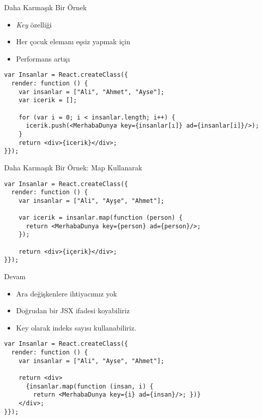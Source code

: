 \documentclass[presentation]{beamer}
\begin{document}
\begin{frame}[fragile,label=sec-4]{Daha Karmaşık Bir Örnek}
 \begin{itemize}
\item \emph{Key} özelliği
\item Her çocuk elemanı eşsiz yapmak için
\item Performans artışı
\end{itemize}

\begin{verbatim}
var Insanlar = React.createClass({
  render: function () {
    var insanlar = ["Ali", "Ahmet", "Ayse"];
    var icerik = [];

    for (var i = 0; i < insanlar.length; i++) {
      icerik.push(<MerhabaDunya key={insanlar[ı]} ad={insanlar[i]}/>);
    }
    return <div>{icerik}</div>;
}});
\end{verbatim}
\end{frame}

\begin{frame}[fragile,label=sec-5]{Daha Karmaşık Bir Örnek: Map Kullanarak}
 \begin{verbatim}
var Insanlar = React.createClass({
  render: function () {
    var insanlar = ["Ali", "Ayşe", "Ahmet"];

    var icerik = insanlar.map(function (person) {
      return <MerhabaDunya key={person} ad={person}/>;
    });

    return <div>{içerik}</div>;
}});
\end{verbatim}
\end{frame}

\begin{frame}[fragile,label=sec-6]{Devam}
 \begin{itemize}
\item Ara değişkenlere ihtiyacımız yok
\item Doğrudan bir JSX ifadesi koyabiliriz
\item Key olarak indeks sayısı kullanabiliriz.
\end{itemize}

\begin{verbatim}
var Insanlar = React.createClass({
  render: function () {
    var insanlar = ["Ali", "Ayse", "Ahmet"];

    return <div>
      {insanlar.map(function (insan, i) {
        return <MerhabaDunya key={i} ad={insan}/>; })}
    </div>;
}});
\end{verbatim}
\end{frame}
\end{document}
